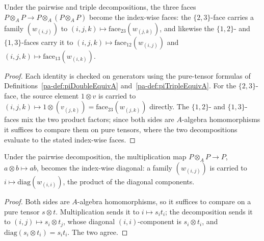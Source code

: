 \begin{lemma}
  \label{pa-lem:descentFace_transport}
  \leanok

  Under the pairwise and triple decompositions, the three faces \(P \otimes_A P \to
  P \otimes_A (P \otimes_A P)\) become the index-wise faces: the \(\{2,3\}\)-face carries a
  family \((w_{(i,j)})\) to \((i,j,k) \mapsto \mathrm{face}_{23}(w_{(j,k)})\), and likewise the
  \(\{1,2\}\)- and \(\{1,3\}\)-faces carry it to
  \((i,j,k) \mapsto \mathrm{face}_{12}(w_{(i,j)})\) and
  \((i,j,k) \mapsto \mathrm{face}_{13}(w_{(i,k)})\).
\end{lemma}
\begin{proof}
  \leanok
  Each identity is checked on generators using the pure-tensor formulas of
  Definitions~\ref{pa-def:piDoubleEquivA} and~\ref{pa-def:piTripleEquivA}. For the \(\{2,3\}\)-face,
  the source element \(1 \otimes v\) is carried to
  \((i,j,k) \mapsto 1 \otimes (v_{(j,k)}) = \mathrm{face}_{23}(w_{(j,k)})\) directly. The
  \(\{1,2\}\)- and \(\{1,3\}\)-faces mix the two product factors; since both sides are
  \(A\)-algebra homomorphisms it suffices to compare them on pure tensors, where the two
  decompositions evaluate to the stated index-wise faces.
\end{proof}

\begin{lemma}
  \label{pa-lem:lmul_transport}
  \leanok

  Under the pairwise decomposition, the multiplication map \(P \otimes_A P \to P\),
  \(a \otimes b \mapsto ab\), becomes the index-wise diagonal: a family \((w_{(i,j)})\) is
  carried to \(i \mapsto \mathrm{diag}(w_{(i,i)})\), the product of the diagonal components.
\end{lemma}
\begin{proof}
  \leanok
  Both sides are \(A\)-algebra homomorphisms, so it suffices to compare on a pure tensor
  \(s \otimes t\). Multiplication sends it to \(i \mapsto s_i t_i\); the decomposition sends it
  to \((i,j) \mapsto s_i \otimes t_j\), whose diagonal \((i,i)\)-component is \(s_i \otimes t_i\),
  and \(\mathrm{diag}(s_i \otimes t_i) = s_i t_i\). The two agree.
\end{proof}

